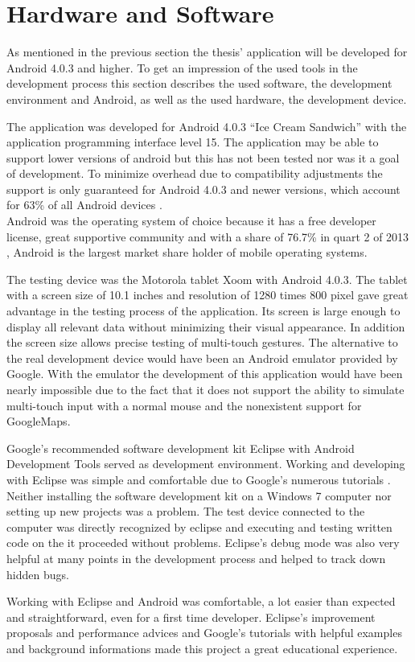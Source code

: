 \section{Hardware and Software}
As mentioned in the previous section the thesis' application will be developed for Android 4.0.3 and higher. To get an impression of the used tools in the development process this section describes the used software, the development environment and Android, as well as the used hardware, the development device.

The  application was developed for Android 4.0.3 ``Ice Cream Sandwich'' with the application programming interface level 15. The application may be able to support lower versions of android but this has not been tested nor was it a goal of development. To minimize overhead due to compatibility adjustments the support is only guaranteed for Android 4.0.3 and newer versions, which account for 63\% of all Android devices \cite{androidversionpercent}.\\
Android was the operating system of choice because it has a free developer license, great supportive community and with a share of 76.7\% in quart 2 of 2013 \cite{androidpercent}, Android is the largest market share holder of mobile operating systems.

The testing device was the Motorola tablet Xoom with Android 4.0.3. The tablet with a screen size of 10.1 inches and resolution of 1280 times 800 pixel gave great advantage in the testing process of the application. Its screen is large enough to display all relevant data without minimizing their visual appearance. In addition the screen size allows precise testing of multi-touch gestures. The alternative to the real development device would have been an Android emulator provided by Google. With the emulator the development of this application would have been nearly impossible due to the fact that it does not support the ability to simulate multi-touch input with a normal mouse and the nonexistent support for GoogleMaps.

Google's  recommended software development kit Eclipse with Android Development Tools served as development environment. Working and developing with Eclipse was simple and comfortable due to Google's numerous tutorials \cite{androidtutorials}. Neither installing the software development kit on a Windows 7 computer nor setting up new projects was a problem. %
The test device connected to the computer was directly recognized by eclipse and executing and testing written code on the it proceeded without problems. Eclipse's debug mode was also very helpful at many points in the development process and helped to track down hidden bugs.

Working with Eclipse and Android was comfortable, a lot easier than expected and straightforward, even for a first time developer. Eclipse's improvement proposals and performance advices and Google's tutorials with helpful examples and background informations made this project a great educational experience.